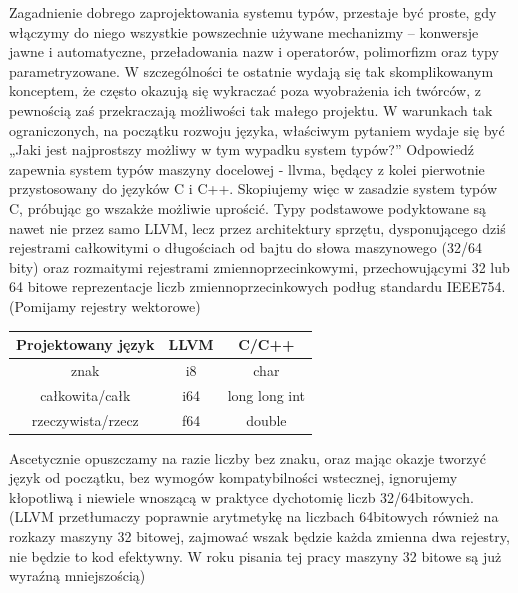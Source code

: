 Zagadnienie dobrego zaprojektowania systemu typów, przestaje być proste, gdy włączymy do niego wszystkie powszechnie używane mechanizmy – konwersje jawne i automatyczne, przeładowania nazw i operatorów, polimorfizm oraz typy parametryzowane. W szczególności te ostatnie wydają się tak skomplikowanym konceptem, że często okazują się wykraczać poza wyobrażenia ich twórców\cite{cpp_templates_turing_complete}\cite{taming_wildcards_java}, z pewnością zaś przekraczają możliwości tak małego projektu.
W warunkach tak ograniczonych, na początku rozwoju języka, właściwym pytaniem wydaje się być „Jaki jest najprostszy możliwy w tym wypadku system typów?” Odpowiedź zapewnia system typów maszyny docelowej - llvma, będący z kolei pierwotnie przystosowany do języków C i C++. Skopiujemy więc w zasadzie system typów C, próbując go wszakże możliwie uprościć.
Typy podstawowe podyktowane są nawet nie przez samo LLVM, lecz przez architektury sprzętu, dysponującego dziś rejestrami całkowitymi o długościach od bajtu do słowa maszynowego (32/64 bity) oraz rozmaitymi rejestrami zmiennoprzecinkowymi, przechowującymi 32 lub 64 bitowe  reprezentacje liczb zmiennoprzecinkowych podług standardu IEEE754. (Pomijamy rejestry wektorowe)
\begin{center}
\begin{tabular}{|c|c|c|}
\hline
\textbf{Projektowany język} & \textbf{LLVM} & \textbf{C/C++} \\ \hline
znak                        & i8       & char               \\ \hline
całkowita/całk              & i64      & long long int      \\ \hline
rzeczywista/rzecz           & f64      & double             \\ \hline
\end{tabular}
\end{center}

Ascetycznie opuszczamy na razie liczby bez znaku, oraz mając okazje tworzyć język od początku, bez wymogów kompatybilności wstecznej, ignorujemy kłopotliwą i niewiele wnoszącą w praktyce dychotomię liczb 32/64bitowych. (LLVM przetłumaczy poprawnie arytmetykę na liczbach 64bitowych również na rozkazy maszyny 32 bitowej, zajmować wszak będzie każda zmienna dwa rejestry, nie będzie to kod efektywny. W roku pisania tej pracy maszyny 32 bitowe są już wyraźną mniejszością)

